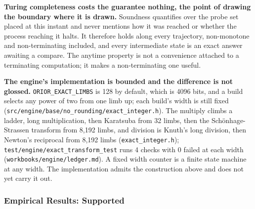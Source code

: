 \textbf{Turing completeness costs the guarantee nothing, the point of drawing the boundary where it is drawn.} Soundness quantifies over the probe set placed at this instant and never mentions how it was reached or whether the process reaching it halts. It therefore holds along every trajectory, non-monotone and non-terminating included, and every intermediate state is an exact answer awaiting a compare. The anytime property is not a convenience attached to a terminating computation; it makes a non-terminating one useful.

\textbf{The engine's implementation is bounded and the difference is not glossed.} \texttt{ORIOR\_EXACT\_LIMBS} is 128 by default, which is 4096 bits, and a build selects any power of two from one limb up; each build's width is still fixed (\texttt{src/\allowbreak{}engine/\allowbreak{}base/\allowbreak{}no\_rounding/\allowbreak{}exact\_integer.h}). The multiply climbs a ladder, long multiplication, then Karatsuba from 32 limbs, then the Schönhage-Strassen transform from 8,192 limbs, and division is Knuth's long division, then Newton's reciprocal from 8,192 limbs (\texttt{exact\_integer.h}); \texttt{test/\allowbreak{}engine/\allowbreak{}exact\_transform\_test} runs 4 checks with 0 failed at each width (\texttt{workbooks/\allowbreak{}engine/\allowbreak{}ledger.md}). A fixed width counter is a finite state machine at any width. The implementation admits the construction above and does not yet carry it out.

\subsubsection{Empirical Results: Supported}

